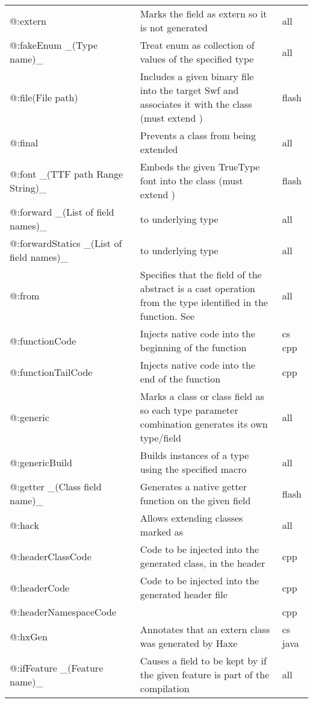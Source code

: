 \begin{center}
\begin{tabular}{| l | l | l |}
	@:extern  &  Marks the field as extern so it is not generated  &  all \\
	@:fakeEnum \_(Type name)\_  &  Treat enum as collection of values of the specified type  &  all \\
	@:file(File path)  &  Includes a given binary file into the target Swf and associates it with the class (must extend \expr{flash.utils.ByteArray})  &  flash \\
	@:final  &  Prevents a class from being extended  &  all \\
	@:font \_(TTF path Range String)\_  &  Embeds the given TrueType font into the class (must extend \expr{flash.text.Font})  &  flash \\
	@:forward \_(List of field names)\_  &  \tref{Forwards field access}{types-abstract-forward} to underlying type  &  all \\
	@:forwardStatics \_(List of field names)\_  &  \tref{Forwards static field access}{types-abstract-forward} to underlying type  &  all \\
	@:from   &  Specifies that the field of the abstract is a cast operation from the type identified in the function. See \tref{Implicit Casts}{types-abstract-implicit-casts}  &  all \\
	@:functionCode  &  Injects native code into the beginning of the function   &  cs cpp \\
	@:functionTailCode  &  Injects native code into the end of the function  &  cpp \\
	@:generic &  Marks a class or class field as \tref{generic}{type-system-generic} so each type parameter combination generates its own type/field  &  all \\
	@:genericBuild  &  Builds instances of a type using the specified macro   &  all \\
	@:getter \_(Class field name)\_  &  Generates a native getter function on the given field   &  flash \\
	@:hack   &  Allows extending classes marked as \expr{@:final}  &  all \\
	@:headerClassCode  &  Code to be injected into the generated class, in the header  &  cpp \\
	@:headerCode   &  Code to be injected into the generated header file  &  cpp \\
	@:headerNamespaceCode  &    &  cpp \\
	@:hxGen  &  Annotates that an extern class was generated by Haxe  &  cs  java \\
	@:ifFeature \_(Feature name)\_  &  Causes a field to be kept by \tref{DCE}{cr-dce} if the given feature is part of the compilation  &  all \\

\end{tabular}
\end{center}
